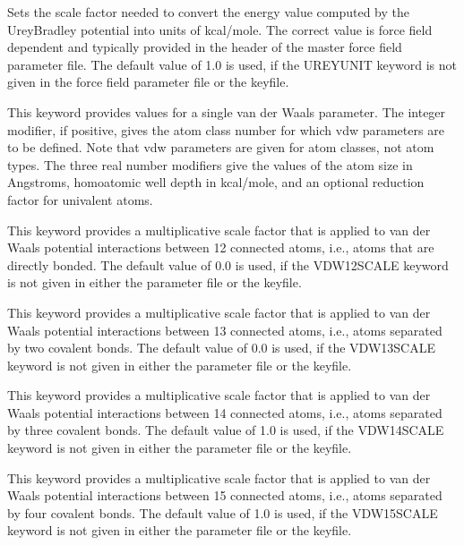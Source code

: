 \documentclass[letterpaper,11pt,english]{sphinxmanual}
\begin{document}
  Sets the scale factor needed to convert the energy value computed by the Urey\sphinxhyphen{}Bradley potential into units of kcal/mole. The correct value is force field dependent and typically provided in the header of the master force field parameter file. The default value of 1.0 is used, if the UREYUNIT keyword is not given in the force field parameter file or the keyfile.

  This keyword provides values for a single van der Waals parameter. The integer modifier, if positive, gives the atom class number for which vdw parameters are to be defined. Note that vdw parameters are given for atom classes, not atom types. The three real number modifiers give the values of the atom size in Angstroms, homoatomic well depth in kcal/mole, and an optional reduction factor for univalent atoms.

  This keyword provides a multiplicative scale factor that is applied to van der Waals potential interactions between 1\sphinxhyphen{}2 connected atoms, i.e., atoms that are directly bonded. The default value of 0.0 is used, if the VDW\sphinxhyphen{}12\sphinxhyphen{}SCALE keyword is not given in either the parameter file or the keyfile.

  This keyword provides a multiplicative scale factor that is applied to van der Waals potential interactions between 1\sphinxhyphen{}3 connected atoms, i.e., atoms separated by two covalent bonds. The default value of 0.0 is used, if the VDW\sphinxhyphen{}13\sphinxhyphen{}SCALE keyword is not given in either the parameter file or the keyfile.

  This keyword provides a multiplicative scale factor that is applied to van der Waals potential interactions between 1\sphinxhyphen{}4 connected atoms, i.e., atoms separated by three covalent bonds. The default value of 1.0 is used, if the VDW\sphinxhyphen{}14\sphinxhyphen{}SCALE keyword is not given in either the parameter file or the keyfile.

  This keyword provides a multiplicative scale factor that is applied to van der Waals potential interactions between 1\sphinxhyphen{}5 connected atoms, i.e., atoms separated by four covalent bonds. The default value of 1.0 is used, if the VDW\sphinxhyphen{}15\sphinxhyphen{}SCALE keyword is not given in either the parameter file or the keyfile.
\end{document}

